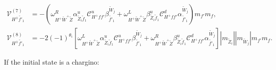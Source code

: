 \documentclass[final,3p,times]{elsarticle}
\begin{document}
\begin{align}
\mathcal{V}_{H^{\pm} \tilde{f'}_1}^{(7)} &= -(\omega_{H^+ \tilde{W}^+ \tilde{Z}}^R \alpha_{\tilde{Z}_i \tilde{f}_1}^{u} \mathcal{C}_{H^+ f f'}^u \beta_{\tilde{f'}_1}^{\tilde{W}_j} + \omega_{H^+ \tilde{W}^+ \tilde{Z}}^L  \beta_{\tilde{Z}_i \tilde{f}_1}^{u} \mathcal{C}_{H^+ f f'}^d \alpha_{\tilde{f'}_1}^{\tilde{W}_j})m_{f'}m_{f},
\\
\mathcal{V}_{H^{\pm} \tilde{f'}_1}^{(8)} &= -2(-1)^{\theta_i}[\omega_{H^+ \tilde{W}^+ \tilde{Z}}^L \alpha_{\tilde{Z}_i \tilde{f}_1}^{u} \mathcal{C}_{H^+ f f'}^u \beta_{\tilde{f'}_1}^{\tilde{W}_j} + \omega_{H^+ \tilde{W}^+ \tilde{Z}}^R \beta_{\tilde{Z}_i \tilde{f}_1}^{u} \mathcal{C}_{H^+ f f'}^d \alpha_{\tilde{f'}_1}^{\tilde{W}_j}]|m_{\tilde{Z}_i}||m_{\tilde{W}_j}|m_{f'}m_{f}.
\end{align}

If the initial state is a chargino:
\end{document}
